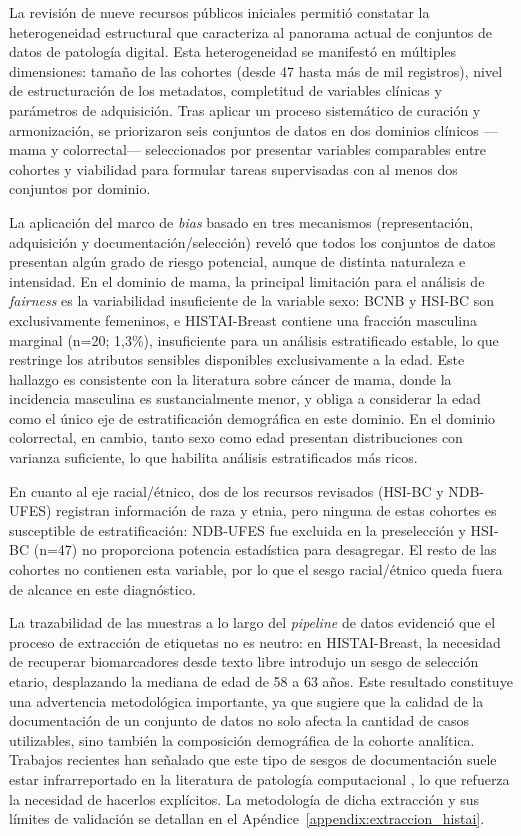 La revisión de nueve recursos públicos iniciales permitió constatar la heterogeneidad estructural que caracteriza al panorama actual de conjuntos de datos de patología digital. Esta heterogeneidad se manifestó en múltiples dimensiones: tamaño de las cohortes (desde 47 hasta más de mil registros), nivel de estructuración de los metadatos, completitud de variables clínicas y parámetros de adquisición. Tras aplicar un proceso sistemático de curación y armonización, se priorizaron seis conjuntos de datos en dos dominios clínicos ---mama y colorrectal--- seleccionados por presentar variables comparables entre cohortes y viabilidad para formular tareas supervisadas con al menos dos conjuntos por dominio.

La aplicación del marco de \textit{bias} basado en tres mecanismos (representación, adquisición y documentación/selección) reveló que todos los conjuntos de datos presentan algún grado de riesgo potencial, aunque de distinta naturaleza e intensidad. En el dominio de mama, la principal limitación para el análisis de \textit{fairness} es la variabilidad insuficiente de la variable sexo: BCNB y HSI-BC son exclusivamente femeninos, e HISTAI-Breast contiene una fracción masculina marginal (n=20; 1,3\%), insuficiente para un análisis estratificado estable, lo que restringe los atributos sensibles disponibles exclusivamente a la edad. Este hallazgo es consistente con la literatura sobre cáncer de mama, donde la incidencia masculina es sustancialmente menor, y obliga a considerar la edad como el único eje de estratificación demográfica en este dominio. En el dominio colorrectal, en cambio, tanto sexo como edad presentan distribuciones con varianza suficiente, lo que habilita análisis estratificados más ricos.

En cuanto al eje racial/étnico, dos de los recursos revisados (HSI-BC y NDB-UFES) registran información de raza y etnia, pero ninguna de estas cohortes es susceptible de estratificación: NDB-UFES fue excluida en la preselección y HSI-BC (n=47) no proporciona potencia estadística para desagregar. El resto de las cohortes no contienen esta variable, por lo que el sesgo racial/étnico queda fuera de alcance en este diagnóstico.

La trazabilidad de las muestras a lo largo del \textit{pipeline} de datos evidenció que el proceso de extracción de etiquetas no es neutro: en HISTAI-Breast, la necesidad de recuperar biomarcadores desde texto libre introdujo un sesgo de selección etario, desplazando la mediana de edad de 58 a 63 años. Este resultado constituye una advertencia metodológica importante, ya que sugiere que la calidad de la documentación de un conjunto de datos no solo afecta la cantidad de casos utilizables, sino también la composición demográfica de la cohorte analítica. Trabajos recientes han señalado que este tipo de sesgos de documentación suele estar infrarreportado en la literatura de patología computacional \parencite{galanty2024}, lo que refuerza la necesidad de hacerlos explícitos. La metodología de dicha extracción y sus límites de validación se detallan en el Apéndice~\ref{appendix:extraccion_histai}.

